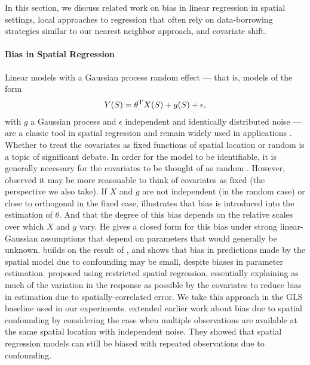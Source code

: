 In this section, we discuss related work on bias in linear regression in spatial settings, local approaches to regression that often rely on data-borrowing strategies similar to our nearest neighbor approach, and covariate shift.

\paragraph{Bias in Spatial Regression}

Linear models with a Gaussian process random effect --- that is, models of the form
\begin{align}
    Y(S) = \theta^{\mathrm{T}} X(S) + g(S) + \epsilon, 
\end{align}
with $g$ a Gaussian process and $\epsilon$ independent and identically distributed noise --- are a classic tool in spatial regression and remain widely used in applications \citep{weber_nnsvg_2023, gramacy2020surrogates, heaton2019case}. Whether to treat the covariates as fixed functions of spatial location or random is a topic of significant debate. In order for the model to be identifiable, it is generally necessary for the covariates to be thought of as random \citep[Proposition 1]{gilbert_consistency_2024}. However, \citet{paciorek_importance_2010} observed it may be more reasonable to think of covariates as fixed (the perspective we also take). If $X$ and $g$ are not independent (in the random case) or close to orthogonal in the fixed case, \citet{paciorek_importance_2010} illustrates that bias is introduced into the estimation of $\theta$. And that the degree of this bias depends on the relative scales over which $X$ and $g$ vary. He gives a closed form for this bias under strong linear-Gaussian assumptions that depend on parameters that would generally be unknown.  builds on the result of \citet{paciorek_importance_2010}, and shows that bias in predictions made by the spatial model due to confounding may be small, despite biases in parameter estimation. \citet{hodges2010adding} proposed using restricted spatial regression, essentially explaining as much of the variation in the response as possible by the covariates to reduce bias in estimation due to spatially-correlated error. We take this approach in the GLS baseline used in our experiments.  extended earlier work about bias due to spatial confounding by considering the case when multiple observations are available at the same spatial location with independent noise. They showed that spatial regression models can still be biased with repeated observations due to confounding. 

